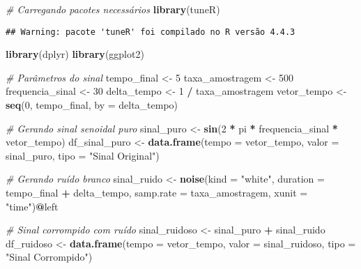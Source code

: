 \documentclass[
]{article}
\newenvironment{Shaded}{\begin{snugshade}}{\end{snugshade}}
\newcommand{\AttributeTok}[1]{\textcolor[rgb]{0.13,0.29,0.53}{#1}}
\newcommand{\CommentTok}[1]{\textcolor[rgb]{0.56,0.35,0.01}{\textit{#1}}}
\newcommand{\DecValTok}[1]{\textcolor[rgb]{0.00,0.00,0.81}{#1}}
\newcommand{\FunctionTok}[1]{\textcolor[rgb]{0.13,0.29,0.53}{\textbf{#1}}}
\newcommand{\NormalTok}[1]{#1}
\newcommand{\OtherTok}[1]{\textcolor[rgb]{0.56,0.35,0.01}{#1}}
\newcommand{\SpecialCharTok}[1]{\textcolor[rgb]{0.81,0.36,0.00}{\textbf{#1}}}
\newcommand{\StringTok}[1]{\textcolor[rgb]{0.31,0.60,0.02}{#1}}
\begin{document}
\begin{Shaded}
\begin{Highlighting}[]
\CommentTok{\# Carregando pacotes necessários}
\FunctionTok{library}\NormalTok{(tuneR)}
\end{Highlighting}
\end{Shaded}

\begin{verbatim}
## Warning: pacote 'tuneR' foi compilado no R versão 4.4.3
\end{verbatim}

\begin{Shaded}
\begin{Highlighting}[]
\FunctionTok{library}\NormalTok{(dplyr)}
\FunctionTok{library}\NormalTok{(ggplot2)}

\CommentTok{\# Parâmetros do sinal}
\NormalTok{tempo\_final }\OtherTok{\textless{}{-}} \DecValTok{5}
\NormalTok{taxa\_amostragem }\OtherTok{\textless{}{-}} \DecValTok{500}
\NormalTok{frequencia\_sinal }\OtherTok{\textless{}{-}} \DecValTok{30}
\NormalTok{delta\_tempo }\OtherTok{\textless{}{-}} \DecValTok{1} \SpecialCharTok{/}\NormalTok{ taxa\_amostragem}
\NormalTok{vetor\_tempo }\OtherTok{\textless{}{-}} \FunctionTok{seq}\NormalTok{(}\DecValTok{0}\NormalTok{, tempo\_final, }\AttributeTok{by =}\NormalTok{ delta\_tempo)}

\CommentTok{\# Gerando sinal senoidal puro}
\NormalTok{sinal\_puro }\OtherTok{\textless{}{-}} \FunctionTok{sin}\NormalTok{(}\DecValTok{2} \SpecialCharTok{*}\NormalTok{ pi }\SpecialCharTok{*}\NormalTok{ frequencia\_sinal }\SpecialCharTok{*}\NormalTok{ vetor\_tempo)}
\NormalTok{df\_sinal\_puro }\OtherTok{\textless{}{-}} \FunctionTok{data.frame}\NormalTok{(}\AttributeTok{tempo =}\NormalTok{ vetor\_tempo, }\AttributeTok{valor =}\NormalTok{ sinal\_puro, }\AttributeTok{tipo =} \StringTok{"Sinal Original"}\NormalTok{)}

\CommentTok{\# Gerando ruído branco}
\NormalTok{sinal\_ruido }\OtherTok{\textless{}{-}} \FunctionTok{noise}\NormalTok{(}\AttributeTok{kind =} \StringTok{"white"}\NormalTok{, }\AttributeTok{duration =}\NormalTok{ tempo\_final }\SpecialCharTok{+}\NormalTok{ delta\_tempo,}
                     \AttributeTok{samp.rate =}\NormalTok{ taxa\_amostragem, }\AttributeTok{xunit =} \StringTok{"time"}\NormalTok{)}\SpecialCharTok{@}\NormalTok{left}

\CommentTok{\# Sinal corrompido com ruído}
\NormalTok{sinal\_ruidoso }\OtherTok{\textless{}{-}}\NormalTok{ sinal\_puro }\SpecialCharTok{+}\NormalTok{ sinal\_ruido}
\NormalTok{df\_ruidoso }\OtherTok{\textless{}{-}} \FunctionTok{data.frame}\NormalTok{(}\AttributeTok{tempo =}\NormalTok{ vetor\_tempo, }\AttributeTok{valor =}\NormalTok{ sinal\_ruidoso, }\AttributeTok{tipo =} \StringTok{"Sinal Corrompido"}\NormalTok{)}


\end{Highlighting}
\end{Shaded}
\end{document}
